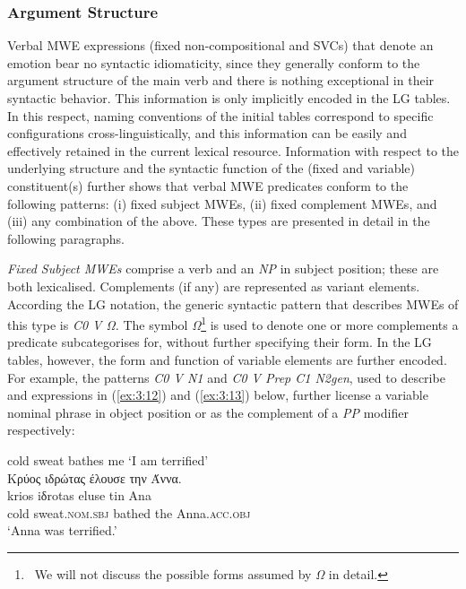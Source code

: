 \documentclass[output=paper]{langsci/langscibook}
\begin{document}
\subsubsection{Argument Structure}



Verbal MWE expressions (fixed non-compositional and SVCs) that denote an
emotion bear no syntactic idiomaticity, since they generally conform to
the argument structure of the main verb and there is nothing
exceptional in their syntactic behavior. This information is only
implicitly encoded in the  LG tables. In this respect, naming
conventions of the initial tables correspond to specific configurations
cross-linguistically, and this information can be easily and
effectively retained in the current lexical resource. Information with
respect to the underlying structure and the syntactic function of the
(fixed and variable) constituent(s) further shows that verbal MWE
predicates conform to the following patterns: (i) fixed subject MWEs,
(ii) fixed complement MWEs, and (iii) any combination of the above.
These types are presented in detail in the following paragraphs. 



\textit{Fixed Subject MWEs} comprise a verb and an \textit{NP
}in subject position; these are both lexicalised. Complements (if any)
are represented as variant elements. According the LG notation, the
generic syntactic pattern that describes MWEs of this type is
\textit{C0 V Ω.} The symbol \textit{Ω}\footnote{\ We will
not discuss  the possible forms assumed by
\textit{Ω} in detail.} is used to denote one or more complements a
predicate subcategorises for, without further specifying their form. In
the LG tables, however, the form and function of variable elements are
further encoded. For example, the patterns \textit{C0 V N1} and
\textit{C0 V Prep C1 N2gen}, used to describe  and  expressions in
(\ref{ex:3:12}) and (\ref{ex:3:13}) below, further license a variable nominal phrase in
object position or as the complement of a \textit{PP} modifier
respectively:

\begin{exe}
\ex \label{ex:3:12}
cold sweat bathes me `I am terrified' \\
\glll Κρύος ιδρώτας έλουσε την Άννα. \\
krios iδrotas eluse tin Ana\\
cold sweat.\textsc{nom.sbj}  bathed the Anna.\textsc{acc.obj}\\
\glt %
‘Anna was terrified.’
\end{exe}
\end{document}
